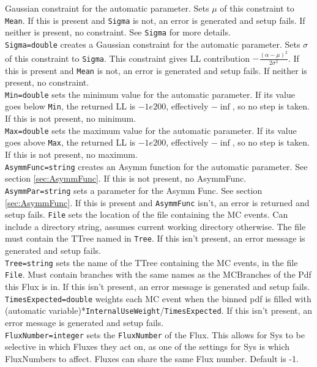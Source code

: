 Gaussian constraint for the automatic parameter.  Sets $\mu$ of this
constraint to \verb|Mean|.  If this is present and \verb|Sigma| is
not, an error is generated and setup fails.  If neither is present, no
constraint.  See \verb|Sigma| for more details.\medskip\\
\verb|Sigma=double| creates a Gaussian constraint for the automatic
parameter.  Sets $\sigma$ of this constraint to \verb|Sigma|.  This
constraint gives LL contribution $\displaystyle
-\frac{(\alpha-\mu)^2}{2 \sigma^2}$.  If this is present and
\verb|Mean| is not, an error is generated and setup fails.  If neither
is present, no constraint.\medskip\\ 
\verb|Min=double| sets the
minimum value for the automatic parameter.  If its value goes below
\verb|Min|, the returned LL is $-1e200$, effectively $-\inf$, so no
step is taken.  If this is not present, no minimum.\medskip\\
\verb|Max=double| sets the maximum value for the automatic parameter.
If its value goes above \verb|Max|, the returned LL is $-1e200$,
effectively $-\inf$, so no step is taken.  If this is not present, no
maximum.\medskip\\ 
\verb|AsymmFunc=string| creates an Asymm function
for the automatic parameter.  See section \ref{sec:AsymmFunc}.  If
this is not present, no AsymmFunc.\medskip\\ 
\verb|AsymmPar=string|
sets a parameter for the Asymm Func.  See section \ref{sec:AsymmFunc}.
If this is present and \verb|AsymmFunc| isn't, an error is returned
and setup fails.  \verb|File| sets the location of the file containing
the MC events.  Can include a directory string, assumes current
working directory otherwise.  The file must contain the TTree named in
\verb|Tree|.  If this isn't present, an error message is generated and
setup fails.\medskip\\ 
\verb|Tree=string| sets the name of the TTree
containing the MC events, in the file \verb|File|.  Must contain
branches with the same names as the MCBranches of the Pdf this Flux is
in.  If this isn't present, an error message is generated and setup
fails.\medskip\\ 
\verb|TimesExpected=double| weights each MC event
when the binned pdf is filled with\\
(automatic variable)*\verb|InternalUseWeight|/\verb|TimesExpected|.
If this isn't present, an error message is generated and setup
fails.\medskip\\ 
\verb|FluxNumber=integer| sets the \verb|FluxNumber|
of the Flux.  This allows for Sys to be selective in which Fluxes they
act on, as one of the settings for Sys is which FluxNumbers to affect.
Fluxes can share the same Flux number.  Default is -1.

